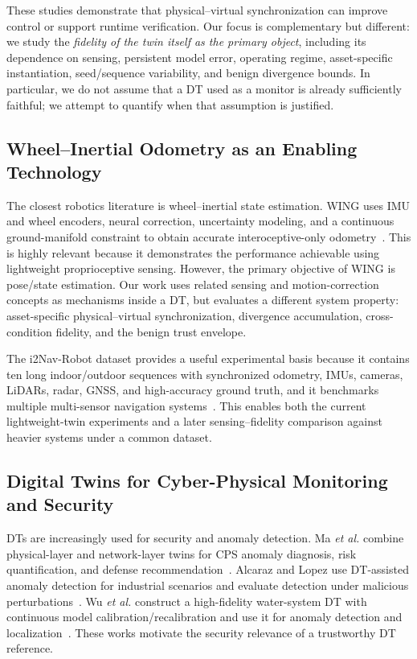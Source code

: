 \documentclass[conference]{IEEEtran}
\begin{document}
These studies demonstrate that physical--virtual synchronization can improve control or support runtime verification. Our focus is complementary but different: we study the \emph{fidelity of the twin itself as the primary object}, including its dependence on sensing, persistent model error, operating regime, asset-specific instantiation, seed/sequence variability, and benign divergence bounds. In particular, we do not assume that a DT used as a monitor is already sufficiently faithful; we attempt to quantify when that assumption is justified.

\subsection{Wheel--Inertial Odometry as an Enabling Technology}
The closest robotics literature is wheel--inertial state estimation. WING uses IMU and wheel encoders, neural correction, uncertainty modeling, and a continuous ground-manifold constraint to obtain accurate interoceptive-only odometry~\cite{jiang2025wing}. This is highly relevant because it demonstrates the performance achievable using lightweight proprioceptive sensing. However, the primary objective of WING is pose/state estimation. Our work uses related sensing and motion-correction concepts as mechanisms inside a DT, but evaluates a different system property: asset-specific physical--virtual synchronization, divergence accumulation, cross-condition fidelity, and the benign trust envelope.

The i2Nav-Robot dataset provides a useful experimental basis because it contains ten long indoor/outdoor sequences with synchronized odometry, IMUs, cameras, LiDARs, radar, GNSS, and high-accuracy ground truth, and it benchmarks multiple multi-sensor navigation systems~\cite{tang2025i2nav}. This enables both the current lightweight-twin experiments and a later sensing--fidelity comparison against heavier systems under a common dataset.

\subsection{Digital Twins for Cyber-Physical Monitoring and Security}
DTs are increasingly used for security and anomaly detection. Ma \emph{et al.} combine physical-layer and network-layer twins for CPS anomaly diagnosis, risk quantification, and defense recommendation~\cite{ma2024cps}. Alcaraz and Lopez use DT-assisted anomaly detection for industrial scenarios and evaluate detection under malicious perturbations~\cite{alcaraz2024anomaly}. Wu \emph{et al.} construct a high-fidelity water-system DT with continuous model calibration/recalibration and use it for anomaly detection and localization~\cite{wu2023water}. These works motivate the security relevance of a trustworthy DT reference.
\end{document}
